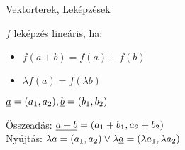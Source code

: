 

\begin{frame}[plain]
\begin{tcolorbox}[center, colback={myyellow}, coltext={black}, colframe={myyellow}]
    {\Huge Vektorterek, Leképzések}
    \mmedskip
\end{tcolorbox}
\end{frame}

\begin{frame}
  \begin{tcolorbox}[title={Def.: Linearitás}]
    $f$ leképzés lineáris, ha:\\
    \begin{itemize}
      \item $f(a + b) = f(a) + f(b)$
      \item ${\lambda}f(a) = f({\lambda}b)$
    \end{itemize}
  \end{tcolorbox}


  \begin{tcolorbox}[title={Def.: Vektorok}]
  $\underline{a} = (a_1, a_2), \underline{b} = (b_1, b_2)$\\
  \mmedskip
  
    Összeadás: $\underline{a + b} = (a_1 + b_1, a_2 + b_2)$\\
    Nyújtás: ${\lambda}a = (a_1, a_2) \lor {\lambda}\underline{a} = ({\lambda}a_1, {\lambda}a_2)$
  \end{tcolorbox}
  
  \end{frame}
  
